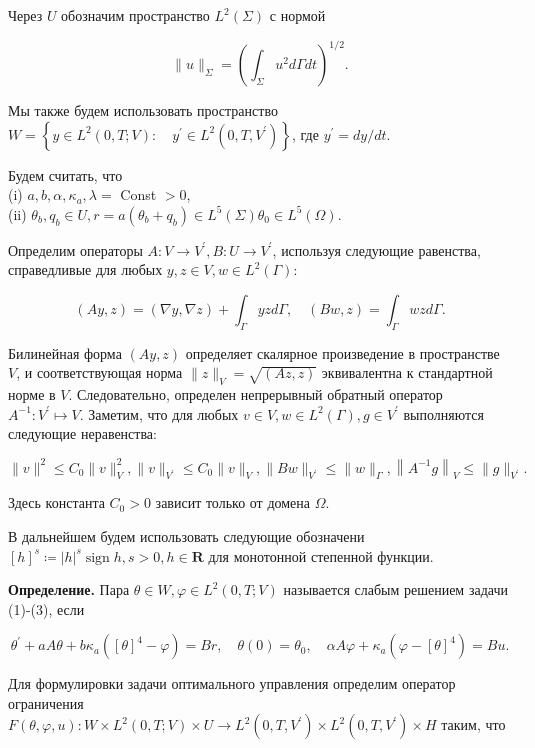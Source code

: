 Через $U$ обозначим пространство $L^{2}(\Sigma)$ с нормой

\[ \|u\|_{\Sigma}=\left(\int_{\Sigma} u^{2} d \Gamma d t\right)^{1 / 2}. \]

Мы также будем использовать пространство
$W=\left\{y \in L^{2}(0, T ; V): \quad y^{\prime}
\in L^{2}\left(0, T, V^{\prime}\right)\right\}$,
где $y^{\prime}=d y / d t$.

Будем считать, что \\
(i) $a, b, \alpha, \kappa_{a}, \lambda=$ Const $>0$, \\
(ii) $\theta_{b}, q_{b} \in U, r=a\left(\theta_{b}+q_{b}\right) \in L^{5}(\Sigma) \theta_{0} \in L^{5}(\Omega)$.


Определим операторы $A: V \rightarrow V^{\prime}, B: U \rightarrow V^{\prime}$,
используя следующие равенства, справедливые для любых $y, z \in V, w \in L^{2}(\Gamma)$:

\[
(A y, z)=(\nabla y, \nabla z)+\int_{\Gamma} y z d \Gamma, \quad(B w, z)=\int_{\Gamma} w z d \Gamma.
\]

Билинейная форма $(A y, z)$ определяет скалярное произведение в пространстве $V$,
и соответствующая норма $\|z\|_{V}=\sqrt{(A z, z)}$ эквивалентна к стандартной норме в $V$.
Следовательно, определен непрерывный обратный оператор $A^{-1}: V^{\prime} \mapsto V$.
Заметим, что для любых $v \in V, w \in L^{2}(\Gamma), g \in V^{\prime}$ выполняются следующие неравенства:

\[
\|v\|^{2} \leq C_{0}\|v\|_{V}^{2},\|v\|_{V^{\prime}} \leq C_{0}\|v\|_{V},\|B w\|_{V^{\prime}}
\leq\|w\|_{\Gamma},\left\|A^{-1} g\right\|_{V} \leq\|g\|_{V^{\prime}}.
\]

Здесь константа $C_{0}>0$ зависит только от домена $\Omega$.

В дальнейшем будем использовать следующие обозначени
$[h]^{s} \coloneqq |h|^{s} \operatorname{sign} h, s>0, h \in \mathbf{R}$
для монотонной степенной функции.


\textbf{Определение.}
Пара $\theta \in W, \varphi \in L^{2}(0, T ; V)$ называется слабым решением задачи (1)-(3), если

\[
\theta^{\prime}+a A \theta+b \kappa_{a}\left([\theta]^{4}-\varphi\right)=B r,
\quad \theta(0)=\theta_{0}, \quad \alpha A \varphi+\kappa_{a}\left(\varphi-[\theta]^{4}\right)=B u.
\]

Для формулировки задачи оптимального управления определим оператор ограничения
$F(\theta, \varphi, u): W \times L^{2}(0, T; V) \times U
\rightarrow L^{2} \left(0, T, V^{\prime}\right)
\times L^{2}\left(0, T, V^{\prime}\right) \times H$ таким, что

